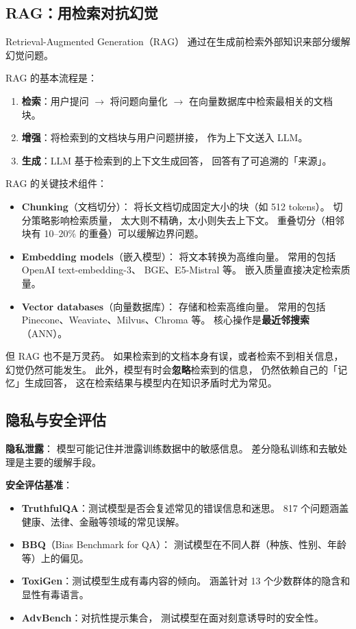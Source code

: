 \subsection{RAG：用检索对抗幻觉}

Retrieval-Augmented Generation（RAG）
通过在生成前检索外部知识来部分缓解幻觉问题。

RAG 的基本流程是：
\begin{enumerate}[noitemsep]
  \item \textbf{检索}：用户提问 $\to$ 将问题向量化 $\to$
        在向量数据库中检索最相关的文档块。
  \item \textbf{增强}：将检索到的文档块与用户问题拼接，
        作为上下文送入 LLM。
  \item \textbf{生成}：LLM 基于检索到的上下文生成回答，
        回答有了可追溯的「来源」。
\end{enumerate}

RAG 的关键技术组件：
\begin{itemize}[noitemsep]
  \item \textbf{Chunking}（文档切分）：
        将长文档切成固定大小的块（如 512 tokens）。
        切分策略影响检索质量，
        太大则不精确，太小则失去上下文。
        重叠切分（相邻块有 10--20\% 的重叠）可以缓解边界问题。
  \item \textbf{Embedding models}（嵌入模型）：
        将文本转换为高维向量。
        常用的包括 OpenAI text-embedding-3、
        BGE、E5-Mistral 等。
        嵌入质量直接决定检索质量。
  \item \textbf{Vector databases}（向量数据库）：
        存储和检索高维向量。
        常用的包括 Pinecone、Weaviate、Milvus、Chroma 等。
        核心操作是\textbf{最近邻搜索}（ANN）。
\end{itemize}

但 RAG 也不是万灵药。
如果检索到的文档本身有误，或者检索不到相关信息，
幻觉仍然可能发生。
此外，模型有时会\textbf{忽略}检索到的信息，
仍然依赖自己的「记忆」生成回答，
这在检索结果与模型内在知识矛盾时尤为常见。

\subsection{隐私与安全评估}

\textbf{隐私泄露}：
模型可能记住并泄露训练数据中的敏感信息。
差分隐私训练和去敏处理是主要的缓解手段。

\textbf{安全评估基准}：
\begin{itemize}[noitemsep]
  \item \textbf{TruthfulQA}：测试模型是否会复述常见的错误信息和迷思。
        817 个问题涵盖健康、法律、金融等领域的常见误解。
  \item \textbf{BBQ}（Bias Benchmark for QA）：
        测试模型在不同人群（种族、性别、年龄等）上的偏见。
  \item \textbf{ToxiGen}：测试模型生成有毒内容的倾向。
        涵盖针对 13 个少数群体的隐含和显性有毒语言。
  \item \textbf{AdvBench}：对抗性提示集合，
        测试模型在面对刻意诱导时的安全性。
\end{itemize}

